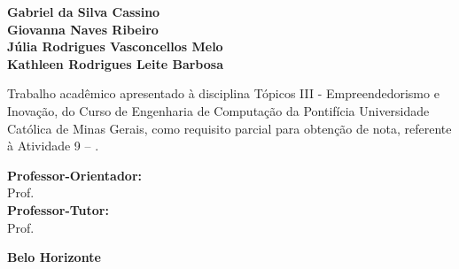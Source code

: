 \begin{folhaderosto}
    \begin{center}
        {\large \textbf{Gabriel da Silva Cassino}} \\
        {\large \textbf{Giovanna Naves Ribeiro}} \\
        {\large \textbf{Júlia Rodrigues Vasconcellos Melo}} \\
        {\large \textbf{Kathleen Rodrigues Leite Barbosa}}

        \vspace{5cm}

        {\Large \textbf{\tituloatividade}}

        \vspace{0.25cm}
        {\Large \tipoatividade}

        \vfill
    \end{center}

    \begin{flushright}
        \begin{minipage}{8cm}
            \begin{singlespace}
                {\small
                    Trabalho acadêmico apresentado à disciplina
                    Tópicos III - Empreendedorismo e Inovação,
                    do Curso de Engenharia de Computação da
                    Pontifícia Universidade Católica de Minas
                    Gerais, como requisito parcial para obtenção
                    de nota, referente à Atividade 9 -- \tituloatividade.
                }

                \vspace{0.5cm}
                {\small
                \textbf{Professor-Orientador:} \\ Prof. \orientador \\
                \textbf{Professor-Tutor:} \\ Prof. \tutor
                }
            \end{singlespace}
        \end{minipage}
    \end{flushright}

    \vfill

    \begin{center}
        {\large \textbf{Belo Horizonte}} \\
        {\large \textbf{\anoentrega}}
    \end{center}
\end{folhaderosto}